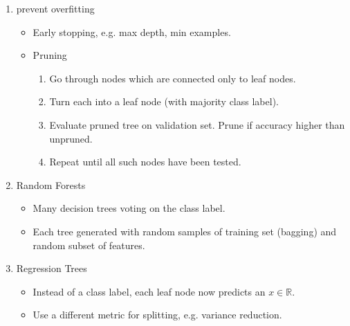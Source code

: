 \documentclass[twocolumn,landscape,10pt]{article}
\theoremstyle{definition}
\begin{document}
\begin{enumerate}
    \item prevent overfitting
        \begin{itemize}
            \item Early stopping, e.g. max depth, min examples.
            \item Pruning
                \begin{enumerate}[label = (\roman*)]
                    \item Go through nodes which are connected only to leaf
                        nodes.
                    \item Turn each into a leaf node (with majority class
                        label).
                    \item Evaluate pruned tree on validation set. Prune if
                        accuracy higher than unpruned.
                    \item Repeat until all such nodes have been tested.
                \end{enumerate} 
        \end{itemize} 
    \item Random Forests
        \begin{itemize}
            \item Many decision trees voting on the class label.
            \item Each tree generated with random samples of training set
                (bagging) and random subset of features.
        \end{itemize} 
    \item Regression Trees
        \begin{itemize}
            \item Instead of a class label, each leaf node now predicts an
                $x\in\mathbb{R}$.
            \item Use a different metric for splitting, e.g. variance reduction.
        \end{itemize} 
\end{enumerate} 
\end{document}
